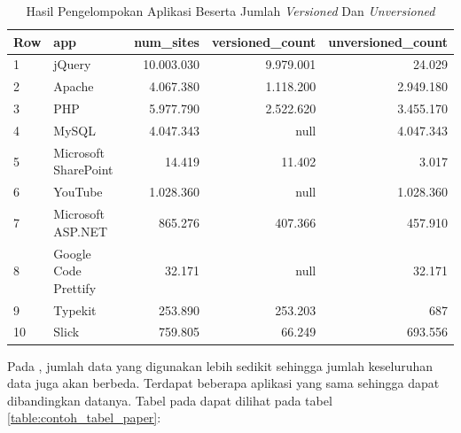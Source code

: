 \begin{table}[H]
\centering
\begin{tabular}{|l|l|r|r|r|}
	\hline
	\textbf{Row} & \textbf{app} & \textbf{num\_sites} & \textbf{versioned\_count} & \textbf{unversioned\_count}\\
	\hline
	1 & jQuery & 10.003.030 & 9.979.001 & 24.029\\
	\hline
	2 & Apache & 4.067.380 & 1.118.200 & 2.949.180\\
	\hline
	3 & PHP & 5.977.790 & 2.522.620 & 3.455.170\\
	\hline
	4 & MySQL & 4.047.343 & null & 4.047.343\\
	\hline
	5 & Microsoft SharePoint & 14.419 & 11.402 & 3.017\\
	\hline
	6 & YouTube & 1.028.360& null & 1.028.360\\
	\hline
	7 & Microsoft ASP.NET & 865.276 & 407.366 & 457.910\\
	\hline
	8 & Google Code Prettify & 32.171 & null & 32.171\\
	\hline
	9 & Typekit & 253.890 & 253.203 & 687\\
	\hline
	10 & Slick & 759.805 & 66.249 & 693.556\\
	\hline
\end{tabular}
\caption{Hasil Pengelompokan Aplikasi Beserta Jumlah \textit{Versioned} Dan \textit{Unversioned}}
\label{table:contoh_langkah3}
\end{table}

Pada \cite{pascal}, jumlah data yang digunakan lebih sedikit sehingga jumlah keseluruhan data juga akan berbeda. Terdapat beberapa aplikasi yang sama sehingga dapat dibandingkan datanya. Tabel pada \cite{pascal} dapat dilihat pada tabel \ref{table:contoh_tabel_paper}: 

